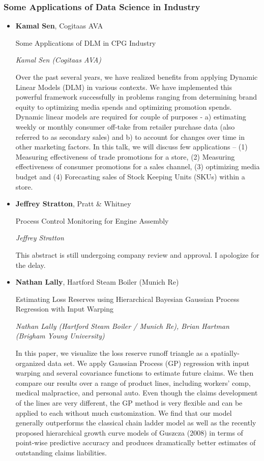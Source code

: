 \subsubsection*{Some Applications of Data Science in Industry}

\begin{itemize}
\item \textbf{Kamal Sen}, Cogitaas AVA

Some Applications of DLM in CPG Industry

\emph{\footnotesize Kamal Sen (Cogitaas AVA)}

Over the past several years, we have realized benefits from applying Dynamic Linear Models (DLM) in various contexts. We have implemented this powerful framework successfully in problems ranging from determining brand equity to optimizing media spends and optimizing promotion spends. Dynamic linear models are required for couple of purposes - a) estimating weekly or monthly consumer off-take from retailer purchase data (also referred to as secondary sales) and b) to account for changes over time in other marketing factors. In this talk, we will discuss few applications -- (1) Measuring effectiveness of trade promotions for a store, (2) Measuring effectiveness of consumer promotions for a sales channel, (3) optimizing media budget and (4) Forecasting sales of Stock Keeping Units (SKUs) within a store.


\item \textbf{Jeffrey Stratton}, Pratt \& Whitney

Process Control Monitoring for Engine Assembly

\emph{\footnotesize Jeffrey Stratton}

This abstract is still undergoing company review and approval.  I apologize for the delay.

\item \textbf{Nathan Lally}, Hartford Steam Boiler (Munich Re)

Estimating Loss Reserves using Hierarchical Bayesian Gaussian Process Regression with Input Warping

\emph{\footnotesize Nathan Lally (Hartford Steam Boiler / Munich Re), Brian Hartman (Brigham Young University)}

In this paper, we visualize the loss reserve runoff triangle as a spatially-organized data set. We apply Gaussian Process (GP) regression with input warping and several covariance functions to estimate future claims. We then compare our results over a range of product lines, including workers’ comp, medical malpractice, and personal auto. Even though the claims development of the lines are very different, the GP method is very flexible and can be applied to each without much customization. We find that our model generally outperforms the classical chain ladder model as well as the recently proposed hierarchical growth curve models of Guszcza (2008) in terms of point-wise predictive accuracy and produces dramatically better estimates of outstanding claims liabilities.

\end{itemize}

